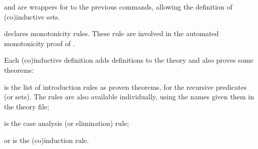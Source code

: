 \begin{isabellebody}
\begin{isamarkuptext}
\begin{description}
  \item \hyperlink{command.HOL.inductive-set}{\mbox{}} and \hyperlink{command.HOL.coinductive-set}{\mbox{}} are wrappers for to the previous commands,
  allowing the definition of (co)inductive sets.

  \item \hyperlink{attribute.HOL.mono}{\mbox{}} declares monotonicity rules.  These
  rule are involved in the automated monotonicity proof of \hyperlink{command.HOL.inductive}{\mbox{}}.

  \end{description}%
\end{isamarkuptext}%
\isamarkuptrue%
%
\isamarkuptrue%
%
\begin{isamarkuptext}%
Each (co)inductive definition  adds definitions to the
  theory and also proves some theorems:

  \begin{description}

  \item {} is the list of introduction rules as proven
  theorems, for the recursive predicates (or sets).  The rules are
  also available individually, using the names given them in the
  theory file;

  \item {} is the case analysis (or elimination) rule;

  \item {} or  is the (co)induction
  rule.

  \end{description}


\end{isamarkuptext}
\end{isabellebody}
